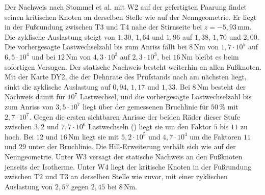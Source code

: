 Der Nachweis nach Stommel et al. mit W2 auf der gefertigten Paarung findet seinen kritischen Knoten an derselben Stelle wie auf der Nenngeometrie. Er liegt in der Fußrundung zwischen T3 und T4 nahe der Stirnseite bei $z = -5{,}93$\,mm. Die zyklische Auslastung steigt von $1{,}30$, $1{,}64$ und $1{,}96$ auf $1{,}38$, $1{,}70$ und $2{,}00$. Die vorhergesagte Lastwechselzahl bis zum Anriss fällt bei $8$\,Nm von $1{,}7 \cdot 10^{5}$ auf $6{,}5 \cdot 10^{4}$ und bei $12$\,Nm von $4{,}3 \cdot 10^{3}$ auf $2{,}3 \cdot 10^{3}$, bei $16$\,Nm bleibt es beim sofortigen Versagen. Der statische Nachweis besteht weiterhin an allen Fußknoten. Mit der Karte DY2, die der Dehnrate des Prüfstands nach  am nächsten liegt, sinkt die zyklische Auslastung auf $0{,}94$, $1{,}17$ und $1{,}33$. Bei $8$\,Nm besteht der Nachweis damit für $10^{7}$ Lastwechsel, und die vorhergesagte Lastwechselzahl bis zum Anriss von $3{,}5 \cdot 10^{7}$ liegt über der gemessenen Bruchlinie für $50$\,\% mit $2{,}7 \cdot 10^{7}$. Gegen die ersten sichtbaren Anrisse der beiden Räder dieser Stufe zwischen $3{,}2$ und $7{,}7 \cdot 10^{6}$ Lastwechseln () liegt sie um den Faktor $5$ bis $11$ zu hoch. Bei $12$ und $16$\,Nm liegt sie mit $5{,}2 \cdot 10^{5}$ und $4{,}7 \cdot 10^{4}$ um die Faktoren $11$ und $29$ unter der Bruchlinie. Die Hill-Erweiterung verhält sich wie auf der Nenngeometrie. Unter W3 versagt der statische Nachweis an den Fußknoten jenseits der Isotherme. Unter W4 liegt der kritische Knoten in der Fußrundung zwischen T2 und T3 an derselben Stelle wie zuvor, mit einer zyklischen Auslastung von $2{,}57$ gegen $2{,}45$ bei $8$\,Nm.

